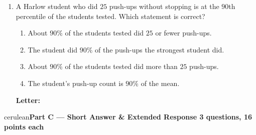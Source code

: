 \documentclass[10pt]{article}
\newcommand{\parthead}[1]{%
  \vspace{6pt}\noindent
  {\tcbset{after={\par\nopagebreak}}%
   \begin{headlinebox}{cerulean}{\color{white}\bfseries #1}\end{headlinebox}}%
  \nopagebreak\vspace{4pt}}
\begin{document}
\begin{enumerate}[leftmargin=2.2em, itemsep=5pt, topsep=2pt, start=6]
\boxguard[9]
\item A Harlow student who did $25$ push-ups without stopping is at the $90$th percentile of
the students tested. Which statement is correct?
\begin{enumerate}[label=(\Alph*), leftmargin=1.8em, itemsep=1pt, topsep=1pt]
  \item About $90\%$ of the students tested did $25$ or fewer push-ups.
  \item The student did $90\%$ of the push-ups the strongest student did.
  \item About $90\%$ of the students tested did more than $25$ push-ups.
  \item The student's push-up count is $90\%$ of the mean.
\end{enumerate}
\hfill \textbf{Letter:} \gradedblank[id=q12, type=choice, points=6, answer={A}]{0.9cm}{11pt}

\end{enumerate}
\normalsize

\boxguard[30]   %
\parthead{Part C --- Short Answer \& Extended Response \hfill 3 questions, 16 points each}
\end{document}
